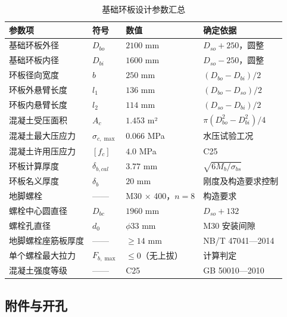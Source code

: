 \begin{table}[!htb]
  \centering
  \caption{基础环板设计参数汇总}
  \label{tab:base-ring-summary}
  \small\renewcommand{\arraystretch}{1.15}
  \setlength{\tabcolsep}{8pt}
  \begin{tabularx}{\textwidth}{@{}l l l l@{}}
    \toprule
    \textbf{参数项} & \textbf{符号} & \textbf{数值} & \textbf{确定依据} \\
    \midrule
    基础环板外径              & $D_{bo}$  & $2100$ mm  & $D_{so} + 250$，圆整 \\
    基础环板内径              & $D_{bi}$  & $1600$ mm  & $D_{so} - 250$，圆整 \\
    环板径向宽度              & $b$       & $250$ mm   & $(D_{bo} - D_{bi})/2$ \\
    环板外悬臂长度            & $l_1$     & $136$ mm   & $(D_{bo} - D_{so})/2$ \\
    环板内悬臂长度            & $l_2$     & $114$ mm   & $(D_{so} - D_{bi})/2$ \\
    混凝土受压面积            & $A_c$     & $1.453$ m² & $\pi(D_{bo}^2 - D_{bi}^2)/4$ \\
    混凝土最大压应力          & $\sigma_{c,\max}$ & $0.066$ MPa & 水压试验工况 \\
    混凝土许用压应力          & $[f_c]$   & $4.0$ MPa  & C25 \\
    环板计算厚度              & $\delta_{b,cal}$ & $3.77$ mm & $\sqrt{6M_b/\sigma_{bs}}$ \\
    环板名义厚度              & $\delta_b$ & $20$ mm    & 刚度及构造要求控制 \\
    地脚螺栓                  & ——       & M30 $\times$ 400，$n = 8$ & 构造要求 \\
    螺栓中心圆直径            & $D_{bc}$  & $1960$ mm  & $D_{so} + 132$ \\
    螺栓孔直径                & $d_0$     & $\phi 33$ mm & M30 安装间隙 \\
    地脚螺栓座筋板厚度        & ——       & $\ge 14$ mm  & NB/T 47041—2014 \\
    单个螺栓最大拉力          & $F_{b,\max}$ & $\le 0$（无上拔）& 计算判定 \\
    混凝土强度等级            & ——       & C25        & GB 50010—2010 \\
    \bottomrule
  \end{tabularx}
\end{table}

\subsection{附件与开孔}

